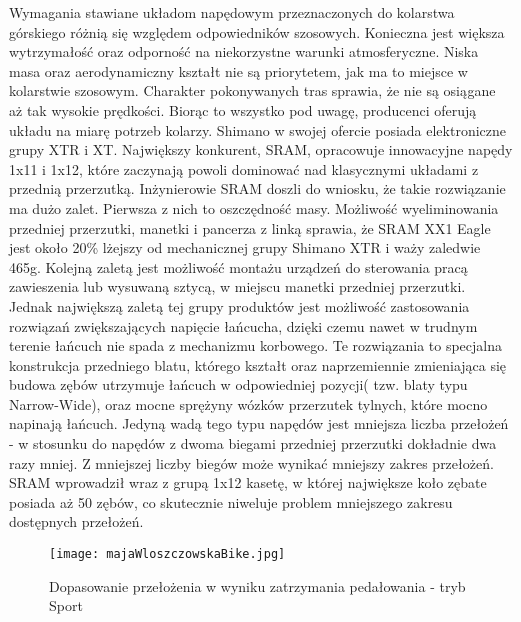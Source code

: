 Wymagania stawiane układom napędowym przeznaczonych do kolarstwa górskiego różnią się względem odpowiedników szosowych. Konieczna jest większa wytrzymałość oraz odporność na niekorzystne warunki atmosferyczne. Niska masa oraz aerodynamiczny kształt nie są priorytetem, jak ma to miejsce w kolarstwie szosowym. Charakter pokonywanych tras sprawia, że nie są osiągane aż tak wysokie prędkości. Biorąc to wszystko pod uwagę, producenci oferują układu na miarę potrzeb kolarzy. Shimano w swojej ofercie posiada elektroniczne grupy XTR i XT. Największy konkurent, SRAM, opracowuje innowacyjne napędy 1x11 i 1x12, które zaczynają powoli dominować nad klasycznymi układami z przednią przerzutką. Inżynierowie SRAM doszli do wniosku, że takie rozwiązanie ma dużo zalet. Pierwsza z nich to oszczędność masy. Możliwość wyeliminowania przedniej przerzutki, manetki i pancerza z linką sprawia, że SRAM XX1 Eagle jest około 20\% lżejszy od mechanicznej grupy Shimano XTR \cite{sramEagle}\cite{shimanoXtr} i waży zaledwie 465g. Kolejną zaletą jest możliwość montażu urządzeń do sterowania pracą zawieszenia lub wysuwaną sztycą, w miejscu manetki przedniej przerzutki. Jednak największą zaletą tej grupy produktów jest możliwość zastosowania rozwiązań zwiększających napięcie łańcucha, dzięki czemu nawet w trudnym terenie łańcuch nie spada z mechanizmu korbowego. Te rozwiązania to specjalna konstrukcja przedniego blatu, którego kształt oraz naprzemiennie zmieniająca się budowa zębów utrzymuje łańcuch w odpowiedniej pozycji( tzw. blaty typu Narrow-Wide), oraz mocne sprężyny wózków przerzutek tylnych, które mocno napinają łańcuch. Jedyną wadą tego typu napędów jest mniejsza liczba przełożeń - w stosunku do napędów z dwoma biegami przedniej przerzutki dokładnie dwa razy mniej. Z mniejszej liczby biegów może wynikać mniejszy zakres przełożeń. SRAM wprowadził wraz z grupą 1x12 kasetę, w której największe koło zębate posiada aż 50 zębów, co skutecznie niweluje problem mniejszego zakresu dostępnych przełożeń.

\begin{figure}[h]
    \centering
    \texttt{[image: majaWloszczowskaBike.jpg]}
    \caption{Dopasowanie przełożenia w wyniku zatrzymania pedałowania - tryb Sport}
    \label{fig:majkaBike}
\end{figure}

